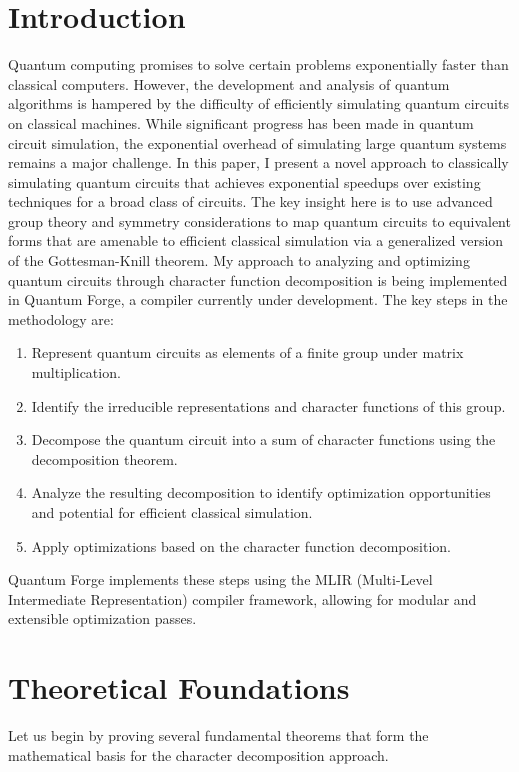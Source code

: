 \documentclass[11pt,a4paper]{article}
\begin{document}
\section{Introduction}
Quantum computing promises to solve certain problems exponentially faster than classical computers\cite{Nielsen2010}. However, the development and analysis of quantum algorithms is hampered by the difficulty of efficiently simulating quantum circuits on classical machines. While significant progress has been made in quantum circuit simulation\cite{Qiskit, Cirq}, the exponential overhead of simulating large quantum systems remains a major challenge.
In this paper, I present a novel approach to classically simulating quantum circuits that achieves exponential speedups over existing techniques for a broad class of circuits. The key insight here is to use advanced group theory and symmetry considerations to map quantum circuits to equivalent forms that are amenable to efficient classical simulation via a generalized version of the Gottesman-Knill theorem.
My approach to analyzing and optimizing quantum circuits through character function decomposition is being implemented in Quantum Forge, a compiler currently under development. The key steps in the methodology are:
\begin{enumerate}
\item Represent quantum circuits as elements of a finite group under matrix multiplication.
\item Identify the irreducible representations and character functions of this group.
\item Decompose the quantum circuit into a sum of character functions using the decomposition theorem.
\item Analyze the resulting decomposition to identify optimization opportunities and potential for efficient classical simulation.
\item Apply optimizations based on the character function decomposition.
\end{enumerate}

Quantum Forge implements these steps using the MLIR (Multi-Level Intermediate Representation) compiler framework\cite{MLIR2020}, allowing for modular and extensible optimization passes.

\section{Theoretical Foundations}
Let us begin by proving several fundamental theorems that form the mathematical basis for the character decomposition approach.
\end{document}
